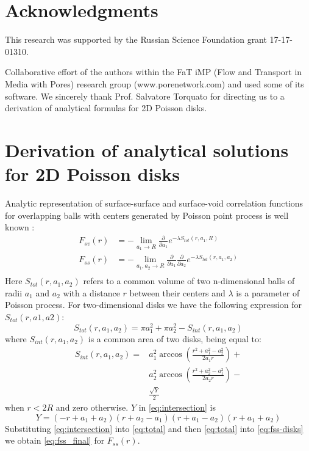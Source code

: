 \documentclass[reprint,amsmath,amssymb,aps,pre]{revtex4-1}
\begin{document}
\section{Acknowledgments}
This research was supported by the Russian Science Foundation grant
17-17-01310.

Collaborative effort of the authors within the FaT iMP (Flow and Transport in
Media with Pores) research group (www.porenetwork.com) and used some of its
software. We sincerely thank Prof. Salvatore Torquato for directing us to a
derivation of analytical formulas for 2D Poisson disks.

\appendix
\section{Derivation of analytical solutions for 2D Poisson disks}
\label{ap:overlapping-disks}
Analytic representation of surface-surface and surface-void correlation
functions for overlapping balls with centers generated by Poisson point process
is well known \cite{Torq_book}:
\begin{align}
  F_{sv}(r) &= -\lim_{a_1 \rightarrow R} \frac{\partial}{\partial a_1}
  e^{-\lambda S_{tot}(r, a_1, R)} \label{eq:fsv-disks} \\
  F_{ss}(r) &= -\lim_{a_1, a_2 \rightarrow R} \frac{\partial}{\partial a_1}
  \frac{\partial}{\partial a_2} e^{-\lambda S_{tot}(r, a_1,
    a_2)} \label{eq:fss-disks} \\
\end{align}
Here $S_{tot}(r, a_1, a_2)$ refers to a common volume of two n-dimensional balls
of radii $a_1$ and $a_2$ with a distance $r$ between their centers and $\lambda$
is a parameter of Poisson process. For two-dimensional disks we have the
following expression for $S_{tot}(r, a1, a2)$:
\begin{equation}
  S_{tot}(r, a_1, a_2) = \pi a_1^2 + \pi a_2^2 - S_{int}(r, a_1, a_2) \label{eq:total}
\end{equation}
where $S_{int}(r, a_1, a_2)$ is a common area of two disks, being equal to:
\cite{Math_stack_link}
\begin{align}
  S_{int}(r, a_1, a_2) =&  a_1^2 \arccos(\frac{r^2+a_1^2-a_2^2}{2a_1r}) + \\
  & a_2^2 \arccos(\frac{r^2+a_2^2-a_1^2}{2a_2r}) - \\
  & \frac{\sqrt{Y}}{2} \label{eq:intersection}
\end{align}
when $r<2R$ and zero otherwise. $Y$ in \cref{eq:intersection} is
\begin{equation*}
  Y = (-r+a_1+a_2)(r+a_2-a_1)(r+a_1-a_2)(r+a_1+a_2)
\end{equation*}
Substituting \cref{eq:intersection} into \cref{eq:total} and then
\cref{eq:total} into \cref{eq:fss-disks} we obtain \cref{eq:fss_final} for
$F_{ss}(r)$.
\end{document}
